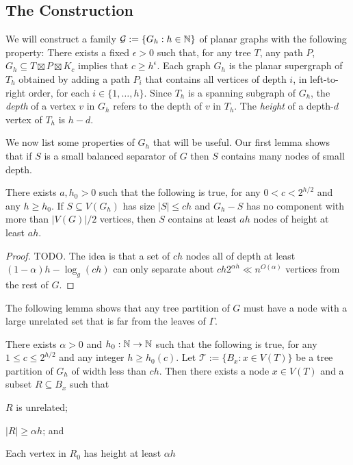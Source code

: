 \documentclass{patmorin}
\newcommand{\defin}[1]{\emph{\color{brightmaroon}#1}}
\renewcommand{\le}{\leqslant}
\renewcommand{\ge}{\geqslant}
\begin{document}
\subsection{The Construction}


We will construct a family $\mathcal{G}:=\{G_{h}:h\in\mathbb{N}\}$ of planar graphs with the following property:  There exists a fixed $\epsilon >0$ such that, for any tree $T$, any path $P$, $G_{h}\subseteq T\boxtimes P\boxtimes K_c$ implies that $c\ge h^\epsilon$.  Each graph $G_{h}$ is the planar supergraph of $T_h$ obtained by adding a path $P_i$ that contains all vertices of depth $i$, in left-to-right order, for each $i\in\{1,\ldots,h\}$.   Since $T_h$ is a spanning subgraph of $G_h$, the \defin{depth} of a vertex $v$ in $G_h$ refers to the depth of $v$ in $T_h$.  The \defin{height} of a depth-$d$ vertex of $T_h$ is $h-d$.


We now list some properties of $G_h$ that will be useful.  
Our first lemma shows that if $S$ is a small balanced separator of $G$ then $S$ contains many nodes of small depth.

\begin{lem}\label{small_depth_separator}
  There exists $a,h_0 >0$ such that the following is true, for any $0 < c < 2^{h/2}$ and any $h\ge h_0$.
  If $S\subseteq V(G_h)$ has size $|S|\le ch$ and $G_h-S$ has no component with more than $|V(G)|/2$ vertices, then $S$ contains at least $ah$ nodes of height at least $ah$. 
\end{lem}

\begin{proof}
  TODO. The idea is that a set of $ch$ nodes all of depth at least $(1-\alpha)h-\log_g(ch)$ can only separate about $ch2^{\alpha h}\ll n^{O(\alpha)}$ vertices from the rest of $G$.
\end{proof}


The following lemma shows that any tree partition of $G$ must have a node with a large unrelated set that is far from the leaves of $\Gamma$.

\begin{lem}\label{startup}
  There exists $\alpha >0$ and $h_0:\mathbb{N}\to\mathbb{N}$ such that the following is true, for any $1\le c\le 2^{h/2}$ and any integer $h\ge h_0(c)$.  Let $\mathcal{T}:=\{B_x:x\in V(T)\}$ be a tree partition of $G_h$ of width less than $ch$.  Then there exists a node $x\in V(T)$ and a subset $R\subseteq B_x$ such that
  \begin{compactenum}[(i)]
    \item $R$ is unrelated;
    \item $|R|\ge \alpha h$; and
    \item Each vertex in $R_0$ has height at least $\alpha h$ 
  \end{compactenum}
\end{lem}
\end{document}
